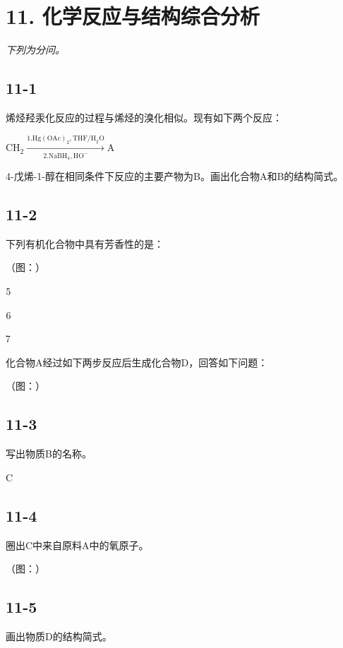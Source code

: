 \section*{11. 化学反应与结构综合分析}
\textit{下列为分问。}

\subsection*{11-1}
烯烃羟汞化反应的过程与烯烃的溴化相似。现有如下两个反应：

$
\mathrm{CH} _ {2} \xrightarrow [ 2 . \mathrm{NaBH} _ {4} , \mathrm{HO} ^ {-} ]{1 . \mathrm{Hg(OAc)} _ {2} , \mathrm{THF/H} _ {2} \mathrm{O}} \mathrm{A}
$

4-戊烯-1-醇在相同条件下反应的主要产物为B。画出化合物A和B的结构简式。

\subsection*{11-2}
下列有机化合物中具有芳⾹性的是：

（图：）







化合物A经过如下两步反应后⽣成化合物D，回答如下问题：

（图：）

\subsection*{11-3}
写出物质B的名称。

C

\subsection*{11-4}
圈出C中来⾃原料A中的氧原⼦。

（图：）

\subsection*{11-5}
画出物质D的结构简式。
